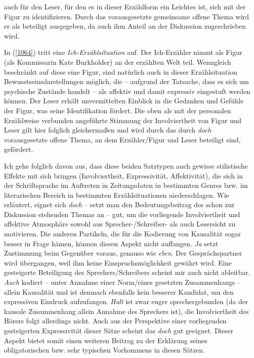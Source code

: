 auch für den Leser, für den es in dieser Erzählform ein Leichtes ist, sich mit der Figur zu identifizieren. Durch das vorausgesetzte gemeinsame offene Thema wird er als beteiligt ausgegeben, da auch ihm Anteil an der Diskussion zugeschrieben wird.

In (\ref{1064}) tritt eine \textit{Ich-Erzählsituation} auf. Der  Ich-Erzähler nimmt als Figur (als Kommissarin Kate Burkholder) an der erzählten Welt teil. Wenngleich beschränkt auf diese eine Figur, sind natürlich auch in dieser Erzählsituation Bewusstseinsdarstellungen möglich, die – aufgrund der Tatsache, dass es sich um psychische Zustände handelt – als affektiv und damit expressiv eingestuft werden können. Der Leser erhält unvermittelten Einblick in die Gedanken und Gefühle der Figur, was seine Identifikation fördert. Die oben als mit der personalen Erzählweise verbunden angeführte Stimmung der Involviertheit von Figur und Leser gilt hier folglich gleichermaßen und wird durch das durch \textit{doch} vorausgesetzte offene Thema, an dem Erzähler/Figur und Leser beteiligt sind, gefördert.

Ich gehe folglich davon aus, dass diese beiden Satztypen auch gewisse stilistische Effekte mit sich bringen (Involviertheit, Expressivität, Affektivität), die sich in der Schriftsprache im Auftreten in Zeitungsdaten in bestimmten Genres bzw. im literarischen Bereich in bestimmten Erzählsituationen niederschlagen. Wie erläutert, eignet sich \textit{doch} – setzt man den Bedeutungsbeitrag des schon zur Diskussion stehenden Themas an – gut, um die vorliegende Involviertheit und affektive Atmosphäre sowohl aus Sprecher-/Schreiber- als auch Lesersicht zu motivieren. Die anderen Partikeln, die für die Kodierung von Kausalität sogar besser in Frage kämen, können diesen Aspekt nicht auffangen. \textit{Ja} setzt Zustimmung beim Gegenüber voraus, genauso wie \textit{eben}. Der Gesprächspartner wird übergangen, weil ihm keine Einspruchsmöglichkeit gewährt wird. Eine gesteigerte Beteiligung des Sprechers/Schreibers scheint mir auch nicht ableitbar. \textit{Auch} ko\-diert – unter Annahme einer Norm/eines gesetzten Zusammenhangs – allein Kausalität und ist demnach ebenfalls kein besserer Kandidat, um den expressiven Eindruck aufzufangen. \textit{Halt} ist zwar enger sprechergebunden (da der kausale Zusammenhang allein Annahme des Sprechers ist), die Involviertheit des Hörers folgt allerdings nicht. Auch aus der Perspektive einer vorliegenden gesteigerten Expressivität dieser Sätze scheint das \textit{doch} gut geeignet. Dieser Aspekt bietet somit einen weiteren Beitrag zu der Erklärung seines obligatorischen bzw. sehr typi\-schen Vorkommens in diesen Sätzen.
	
